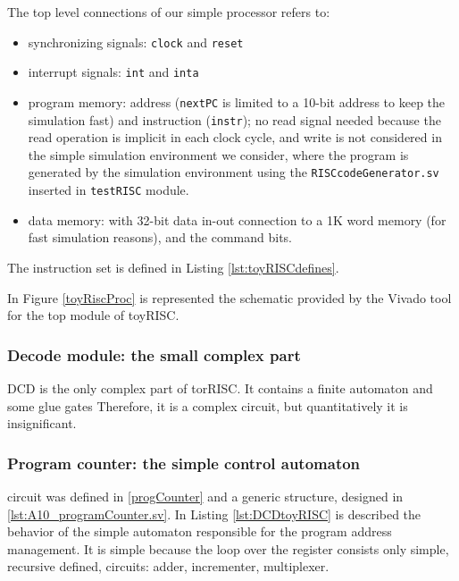 The top level connections of our simple processor refers to:
\begin{itemize}
    \item synchronizing signals: {\tt clock} and {\tt reset}
    \item interrupt signals: {\tt int} and {\tt inta}
    \item program memory: address ({\tt nextPC} is limited to a 10-bit address to keep the simulation fast) and instruction ({\tt instr}); no read signal needed because the read operation is implicit in each clock cycle, and write is not considered in the simple simulation environment we consider, where the program is generated by the simulation environment using the {\tt RISCcodeGenerator.sv} inserted in {\tt testRISC} module.
    \item data memory: with 32-bit data in-out connection to a 1K  word memory (for fast simulation reasons), and the command bits.
\end{itemize}
The instruction set is defined in Listing \ref{lst:toyRISCdefines}.



In Figure \ref{toyRiscProc} is represented the schematic provided by the Vivado tool for the top module of toyRISC.


\subsubsection{Decode module: the small complex part} DCD is the only complex part of torRISC. It contains a finite automaton and some glue gates Therefore, it is a complex circuit, but quantitatively it is insignificant.


\subsubsection{Program counter: the simple control automaton} circuit was defined in \ref{progCounter} and  a generic structure, designed in \ref{lst:A10_programCounter.sv}. In Listing \ref{lst:DCDtoyRISC} is described the behavior of the simple automaton responsible for the program address management. It is simple because the loop over the register consists only simple, recursive defined, circuits: adder, incrementer, multiplexer.

